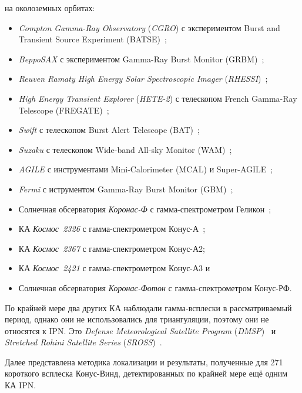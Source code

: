 на околоземных орбитах:
\begin{itemize}
\item \textit{Compton Gamma-Ray Observatory} (\textit{CGRO}) с экспериментом Burst and Transient Source Experiment (BATSE)~\citep{Fishman_1992NASCP3137};
\item \textit{BeppoSAX} с экспериментом Gamma-Ray Burst Monitor (GRBM)~\citep{Frontera_1997AAS,Feroci_1997SPIE};
\item \textit{Reuven Ramaty High Energy Solar Spectroscopic Imager} (\textit{RHESSI})~\citep{Lin_2002SoPh, Smith_2002SoPh};
\item \textit{High Energy Transient Explorer} (\textit{HETE-2}) с телескопом French Gamma-Ray Telescope (FREGATE)~\citep{Ricker_2003AIPC, Atteia_2003AIPC};
\item \textit{Swift} с телескопом Burst Alert Telescope (BAT)~\citep{Barthelmy_2005SSRv,Gehrels_2004ApJ};
\item \textit{Suzaku} с телескопом Wide-band All-sky Monitor (WAM)~\citep{Yamaoka_2009PASJ,Takahashi_2007PASJ};
\item \textit{AGILE} с инструментами Mini-Calorimeter (MCAL) и Super-AGILE~\citep{Tavani_2009AA};
\item \textit{Fermi} с иструментом Gamma-Ray Burst Monitor (GBM)~\citep{Meegan_2009ApJ};
\item Солнечная обсерватория \textit{Коронас-Ф} с гамма-спектрометром Геликон~\citep{Oraevskii_2002PhyU};
\item КА \textit{Космос~2326} с гамма-спектрометром Конус-А~\citep{Aptekar_1998ApJ};
\item КА \textit{Космос~2367} с гамма-спектрометром Конус-А2;
\item КА \textit{Космос~2421} с гамма-спектрометром Конус-А3 и
\item Солнечная обсерватория \textit{Коронас-Фотон} с гамма-спектрометром Конус-РФ.
\end{itemize}

По крайней мере два других КА наблюдали гамма-всплески в рассматриваемый период, 
однако они не использовались для триангуляции, поэтому они не относятся к IPN. 
Это \textit{Defense Meteorological Satellite Program}
(\textit{DMSP})~\citep{Terrell_1998AIPC,Terrell_1996AIPC,Terrell_2004AIPC} и 
\textit{Stretched Rohini Satellite Series} (\textit{SROSS})~\citep{Marar_1994AA}.

Далее представлена методика локализации и результаты, полученные для 271 короткого 
всплеска Конус-Винд, детектированных по крайней мере ещё одним КА IPN.

